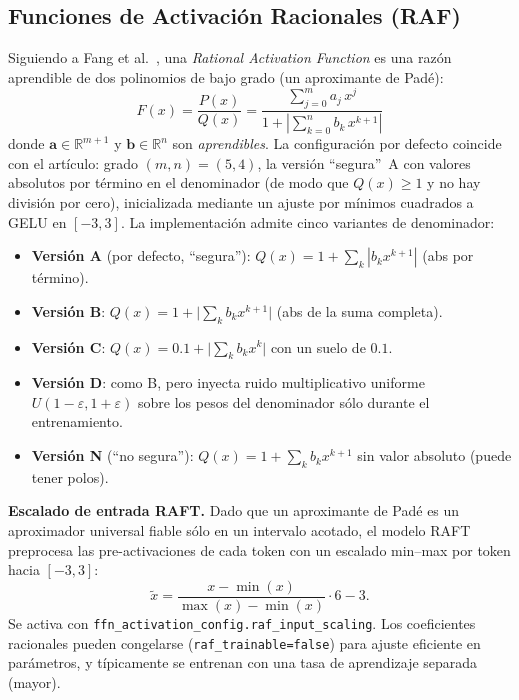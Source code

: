 \subsection{Funciones de Activación Racionales (RAF)}
\label{sec:raf-es}

Siguiendo a Fang et al.~\citep{fang2023raft}, una \emph{Rational Activation
Function} es una razón aprendible de dos polinomios de bajo grado (un
aproximante de Padé):
\[
F(x) = \frac{P(x)}{Q(x)} = \frac{\displaystyle\sum_{j=0}^{m} a_j\, x^{j}}{1 + \left|\displaystyle\sum_{k=0}^{n} b_k\, x^{k+1}\right|}
\]
donde $\mathbf{a}\in\mathbb{R}^{m+1}$ y $\mathbf{b}\in\mathbb{R}^{n}$ son
\emph{aprendibles}. La configuración por defecto coincide con el artículo:
grado $(m,n)=(5,4)$, la versión ``segura''~A con valores absolutos por término
en el denominador (de modo que $Q(x)\ge 1$ y no hay división por cero),
inicializada mediante un ajuste por mínimos cuadrados a GELU en $[-3,3]$. La
implementación admite cinco variantes de denominador:

\begin{itemize}[leftmargin=*]
    \item \textbf{Versión A} (por defecto, ``segura''): $Q(x)=1+\sum_k|b_k x^{k+1}|$ (abs por término).
    \item \textbf{Versión B}: $Q(x)=1+\big|\sum_k b_k x^{k+1}\big|$ (abs de la suma completa).
    \item \textbf{Versión C}: $Q(x)=0.1+\big|\sum_k b_k x^k\big|$ con un suelo de $0.1$.
    \item \textbf{Versión D}: como B, pero inyecta ruido multiplicativo uniforme $U(1-\varepsilon,1+\varepsilon)$ sobre los pesos del denominador sólo durante el entrenamiento.
    \item \textbf{Versión N} (``no segura''): $Q(x)=1+\sum_k b_k x^{k+1}$ sin valor absoluto (puede tener polos).
\end{itemize}

\textbf{Escalado de entrada RAFT.} Dado que un aproximante de Padé es un
aproximador universal fiable sólo en un intervalo acotado, el modelo RAFT
preprocesa las pre-activaciones de cada token con un escalado min--max por
token hacia $[-3,3]$:
\[
\tilde{x} = \frac{x-\min(x)}{\max(x)-\min(x)}\cdot 6 - 3.
\]
Se activa con \texttt{ffn\_activation\_config.raf\_input\_scaling}. Los
coeficientes racionales pueden congelarse
(\texttt{raf\_trainable=false}) para ajuste eficiente en parámetros, y
típicamente se entrenan con una tasa de aprendizaje separada (mayor).

